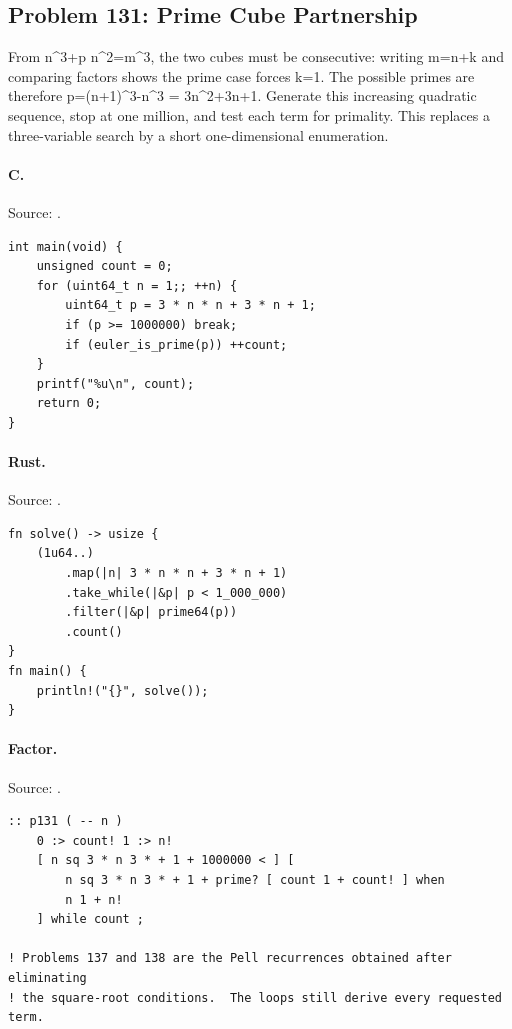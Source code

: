 \subsection{Problem 131: Prime Cube Partnership}
\label{walkthrough:p131}
From n\textasciicircum{}3+p n\textasciicircum{}2=m\textasciicircum{}3, the two cubes must be consecutive: writing m=n+k and comparing factors shows the prime case forces k=1. The possible primes are therefore p=(n+1)\textasciicircum{}3-n\textasciicircum{}3 = 3n\textasciicircum{}2+3n+1. Generate this increasing quadratic sequence, stop at one million, and test each term for primality. This replaces a three-variable search by a short one-dimensional enumeration.

\paragraph{C.} Source: .
\begin{lstlisting}
int main(void) {
    unsigned count = 0;
    for (uint64_t n = 1;; ++n) {
        uint64_t p = 3 * n * n + 3 * n + 1;
        if (p >= 1000000) break;
        if (euler_is_prime(p)) ++count;
    }
    printf("%u\n", count);
    return 0;
}
\end{lstlisting}

\paragraph{Rust.} Source: .
\begin{lstlisting}
fn solve() -> usize {
    (1u64..)
        .map(|n| 3 * n * n + 3 * n + 1)
        .take_while(|&p| p < 1_000_000)
        .filter(|&p| prime64(p))
        .count()
}
fn main() {
    println!("{}", solve());
}
\end{lstlisting}

\paragraph{Factor.} Source: .
\begin{lstlisting}
:: p131 ( -- n )
    0 :> count! 1 :> n!
    [ n sq 3 * n 3 * + 1 + 1000000 < ] [
        n sq 3 * n 3 * + 1 + prime? [ count 1 + count! ] when
        n 1 + n!
    ] while count ;

! Problems 137 and 138 are the Pell recurrences obtained after eliminating
! the square-root conditions.  The loops still derive every requested term.
\end{lstlisting}

